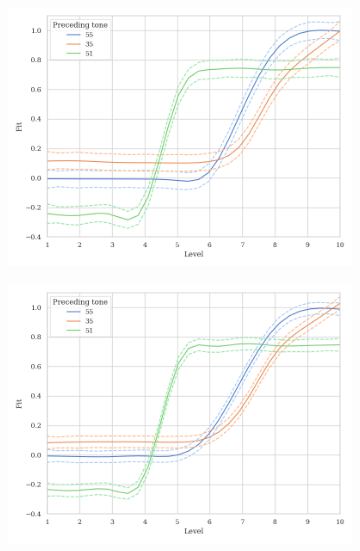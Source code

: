 \begin{figure}[hbt!]
\centering
\begin{subfigure}[b]{.45\textwidth}
\centering
\includegraphics[width=\textwidth]{figures/E2/Mandarin_GAMM.png}
\end{subfigure}
\hfill
\begin{subfigure}[b]{.45\textwidth}
\centering
\includegraphics[width=\textwidth]{figures/E2/Mandarin_bilingual_GAMM.png}
\end{subfigure}
\hfill
\begin{subfigure}[b]{.45\textwidth}
\centering

\end{subfigure}
\end{figure}
